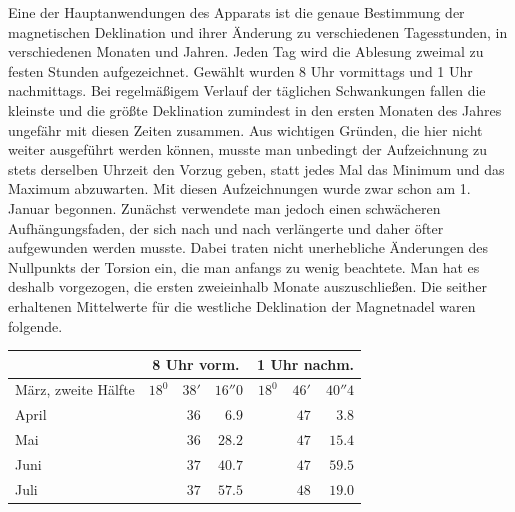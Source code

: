Eine der Hauptanwendungen des Apparats ist die genaue Bestimmung der magnetischen Deklination und ihrer Änderung zu verschiedenen Tagesstunden, in verschiedenen Monaten und Jahren. Jeden Tag wird die Ablesung zweimal zu festen Stunden aufgezeichnet. Gewählt wurden 8 Uhr vormittags und 1 Uhr nachmittags. Bei regelmäßigem Verlauf der täglichen Schwankungen fallen die kleinste und die größte Deklination zumindest in den ersten Monaten des Jahres ungefähr mit diesen Zeiten zusammen. Aus wichtigen Gründen, die hier nicht weiter ausgeführt werden können, musste man unbedingt der Aufzeichnung zu stets derselben Uhrzeit den Vorzug geben, statt jedes Mal das Minimum und das Maximum abzuwarten. Mit diesen Aufzeichnungen wurde zwar schon am 1. Januar begonnen. Zunächst verwendete man jedoch einen schwächeren Aufhängungsfaden, der sich nach und nach verlängerte und daher öfter aufgewunden werden musste. Dabei traten nicht unerhebliche Änderungen des Nullpunkts der Torsion ein, die man anfangs zu wenig beachtete. Man hat es deshalb vorgezogen, die ersten zweieinhalb Monate auszuschließen. Die seither erhaltenen Mittelwerte für die westliche Deklination der Magnetnadel waren folgende.
\begin{center}
\begin{tabular}{l|rrr|rrr}
 & \multicolumn{3}{c|}{8 Uhr vorm.} & \multicolumn{3}{c}{1 Uhr nachm.}\\\hline
März, zweite Hälfte & $18^0$ & $38'$ & $16''0$ & $18^0$ & $46'$ & $40''4$\\
April & & $36$ & $6.9$ & & $47$ & $3.8$\\
Mai & & $36$ & $28.2$ & & $47$ & $15.4$\\
Juni & & $37$ & $40.7$ & & $47$ & $59.5$\\
Juli & & $37$ & $57.5$ & & $48$ & $19.0$
\end{tabular}
\end{center}

